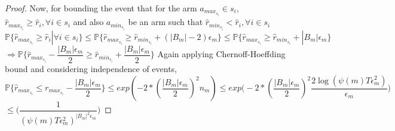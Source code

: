 \begin{proof}
\newline Now, for bounding the event that for the arm $a_{max_{s_{i}}}\in s_{i}$, $\hat{r}_{max_{s_{i}}}\geq \hat{r}_{i}, \forall i\in s_{i}$ and also $a_{min_{s_{i}}}$ be an arm such that $\hat{r}_{min_{s_{i}}}< \hat{r}_{i}, \forall i\in s_{i}$
\newline
$\mathbb{P}\lbrace\hat{r}_{max_{s_{i}}}\geq \hat{r}_{i}|\forall i\in s_{i}\rbrace\leq \mathbb{P}\lbrace\hat{r}_{max_{s_{i}}}\geq \hat{r}_{min_{s_{i}}}+(|B_{m}|-2)\epsilon_{m}\rbrace\leq \mathbb{P}\lbrace\hat{r}_{max_{s_{i}}} \geq \hat{r}_{min_{s_{i}}}+|B_{m}|\epsilon_{m}\rbrace$
\newline
$\Rightarrow \mathbb{P}\lbrace \hat{r}_{max_{s_{i}}} - \dfrac{|B_{m}|\epsilon_{m}}{2} \geq \hat{r}_{min_{s_{i}}}+\dfrac{|B_{m}|\epsilon_{m}}{2} \rbrace$
\newline
Again applying Chernoff-Hoeffding bound and considering independence of events,
\newline
$\mathbb{P}\lbrace\hat{r}_{max_{s_{i}}}\leq r_{max_{s_{i}}} - \dfrac{|B_{m}|\epsilon_{m}}{2}\rbrace\leq exp(-2*(\dfrac{|B_{m}|\epsilon_{m}}{2})^{2}n_{m})\leq exp\bigg(-2*(\dfrac{|B_{m}|\epsilon_{m}}{2})^{2}\dfrac{2\log{(\psi(m)T\epsilon_{m}^{2})}}{\epsilon_{m}}\bigg)$
\newline\hspace*{21em}$\leq \bigg(\dfrac{1}{(\psi(m)T\epsilon_{m}^{2})^{|B_{m}|^{2}\epsilon_{m}}}\bigg)$

\end{proof}
